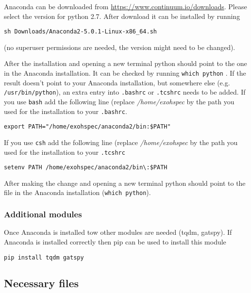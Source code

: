 \documentclass[10pt,a4paper]{article}
\begin{document}
\noindent Anaconda can be downloaded from \url{https://www.continuum.io/downloads}. Please select the version for python 2.7. After download it can be installed by running
\begin{lstlisting}[style=base]
sh Downloads/Anaconda2-5.0.1-Linux-x86_64.sh
\end{lstlisting}
(no superuser permissions are needed, the version might need to be changed).

After the installation and opening a new terminal python should point to the one in the Anaconda installation. It can be checked by running \verb|which python| . If the result doesn't point to your Anaconda installation, but somewhere else (e.g. \verb|/usr/bin/python|), an extra entry into \verb|.bashrc| or \verb|.tcshrc| needs to be added. If you use \verb|bash| add the following line (replace \textit{/home/exohspec} by the path you used for the installation to your \verb|.bashrc|. %
\begin{lstlisting}[style=base]
export PATH="/home/exohspec/anaconda2/bin:$PATH"
\end{lstlisting}
If you use \verb|csh| add the following line (replace \textit{/home/exohspec} by the path you used for the installation to your \verb|.tcshrc|
\begin{lstlisting}[style=base]
setenv PATH /home/exohspec/anaconda2/bin\:$PATH
\end{lstlisting}

After making the change and opening a new terminal python should point to the file in the Anaconda installation (\verb|which python|).

\subsubsection{Additional modules}

\noindent Once Anaconda is installed tow other modules are needed (tqdm, gatspy). If Anaconda is installed correctly then pip can be used to install this module
\begin{lstlisting}[style=base]
pip install tqdm gatspy
\end{lstlisting}



\subsection{Necessary files}
\end{document}
